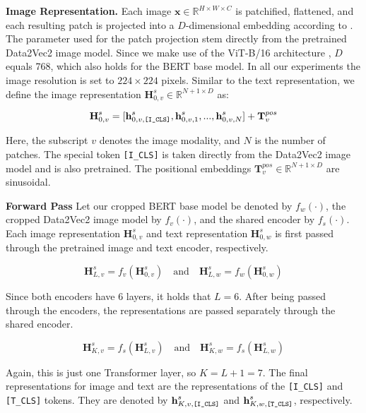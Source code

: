 \documentclass[10pt]{article} %
\begin{document}
\textbf{Image Representation.} Each image $\mathbf{x} \in \mathbb{R}^{H\times W\times C}$ is patchified, flattened, and each resulting patch
is projected into a $D$-dimensional embedding according to \citep{vit}. The parameter used for the patch projection stem directly from the
pretrained Data2Vec2 \citep{data2vec2} image model. Since we make use of the ViT-B/16 architecture \citep{vit}, $D$ equals 768, which
also holds for the BERT base model. In all our experiments the image resolution is set to $224\times 224$ pixels. Similar to the text
representation, we define the image representation $\textbf{H}^{s}_{0, v} \in \mathbb{R}^{N+1\times D}$ as:

\[
\textbf{H}^{s}_{0, v} = [\textbf{h}^{s}_{0, v, \text{\texttt{[I\_CLS]}}}, \textbf{h}^{s}_{0, v, 1}, ..., \textbf{h}^{s}_{0, v, N}] + \textbf{T}^{pos}_{v}
\]

Here, the subscript $v$ denotes the image modality, and $N$ is the number of patches. The special token \texttt{[I\_CLS]} is taken directly
from the Data2Vec2 \citep{data2vec2} image model and is also pretrained. The positional embeddings $\textbf{T}^{pos}_{v} \in \mathbb{R}^{N+1\times D}$ are sinusoidal.

\textbf{Forward Pass} Let our cropped BERT base model be denoted by $f_{w}(\cdot)$, the cropped Data2Vec2 image model by $f_{v}(\cdot)$, and the shared
encoder by $f_{s}(\cdot)$. Each image representation $\textbf{H}^{s}_{0, v}$ and text representation $\textbf{H}^{s}_{0, w}$ is first passed through
the pretrained image and text encoder, respectively.

\[
\textbf{H}^{s}_{L, v} = f_{v}(\textbf{H}^{s}_{0, v}) \quad \text{and} \quad \textbf{H}^{s}_{L, w} = f_{w}(\textbf{H}^{s}_{0, w})
\]

Since both encoders have 6 layers, it holds that $L=6$. After being passed through the encoders, the representations
are passed separately through the shared encoder.

\[
\textbf{H}^{s}_{K, v} = f_{s}(\textbf{H}^{s}_{L, v}) \quad \text{and} \quad \textbf{H}^{s}_{K, w} = f_{s}(\textbf{H}^{s}_{L, w})
\]

Again, this is just one Transformer layer, so $K=L+1=7$. The final representations for image and text are the representations
of the \texttt{[I\_CLS]} and \texttt{[T\_CLS]} tokens. They are denoted by $\textbf{h}^{s}_{K, v, \text{\texttt{[I\_CLS]}}}$ and
$\textbf{h}^{s}_{K, w, \text{\texttt{[T\_CLS]}}}$, respectively.
\end{document}
